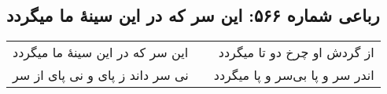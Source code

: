 \begin{center}
\section*{رباعی شماره ۵۶۶: این سر که در این سینهٔ ما میگردد}
\label{sec:0566}
\begin{longtable}{l p{0.5cm} r}
این سر که در این سینهٔ ما میگردد
&&
از گردش او چرخ دو تا میگردد
\\
نی سر داند ز پای و نی پای از سر
&&
اندر سر و پا بی‌سر و پا میگردد
\\
\end{longtable}
\end{center}
